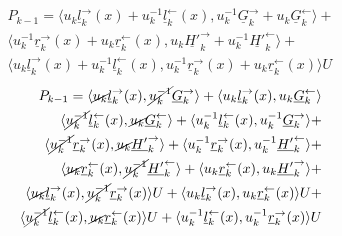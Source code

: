 \begin{align*}
P_{k-1} = \langle u_{k} \underline{l}_{k}^{\rightarrow}(x) + u_{k}^{-1} \underline{l}_{k}^{\leftarrow}(x), u_{k}^{-1} \underline{G}_{k}^{\rightarrow} + u_{k} \underline{G}_{k}^{\leftarrow}\rangle +\\ \langle u_{k}^{-1} \underline{r}_{k}^{\rightarrow}(x) + u_{k} \underline{r}_{k}^{\leftarrow}(x), u_{k} \underline{H'}_{k}^{\rightarrow} + u_{k}^{-1} \underline{H'}_{k}^{\leftarrow}\rangle +\\\langle u_{k} \underline{l}_{k}^{\rightarrow}(x) + u_{k}^{-1} \underline{l}_{k}^{\leftarrow}(x), u_{k}^{-1} \underline{r}_{k}^{\rightarrow}(x) + u_{k} \underline{r}_{k}^{\leftarrow}(x)\rangle U
\end{align*}
\newline
\begin{align*}
P_{k-1} = 
\langle \cancel{u_{k}} \underline{l}_{k}^{\rightarrow}(x), \cancel{u_{k}^{-1}} \underline{G}_{k}^{\rightarrow}\rangle + \langle u_{k} \underline{l}_{k}^{\rightarrow}(x), u_{k} \underline{G}_{k}^{\leftarrow}\rangle \\
\langle \cancel{u_{k}^{-1}} \underline{l}_{k}^{\leftarrow}(x), \cancel{u_{k}} \underline{G}_{k}^{\leftarrow}\rangle + \langle u_{k}^{-1} \underline{l}_{k}^{\leftarrow}(x), u_{k}^{-1} \underline{G}_{k}^{\rightarrow}\rangle +\\ 
\langle \cancel{u_{k}^{-1}} \underline{r}_{k}^{\rightarrow}(x), \cancel{u_{k}} \underline{H'}_{k}^{\rightarrow}\rangle + \langle u_{k}^{-1} \underline{r}_{k}^{\rightarrow}(x), u_{k}^{-1} \underline{H'}_{k}^{\leftarrow}\rangle +\\
\langle \cancel{u_{k}} \underline{r}_{k}^{\leftarrow}(x), \cancel{u_{k}^{-1}} \underline{H'}_{k}^{\leftarrow}\rangle + \langle u_{k} \underline{r}_{k}^{\leftarrow}(x), u_{k} \underline{H'}_{k}^{\rightarrow}\rangle +\\
\langle \cancel{u_{k}} \underline{l}_{k}^{\rightarrow}(x), \cancel{u_{k}^{-1}} \underline{r}_{k}^{\rightarrow}(x) \rangle U + \langle u_{k} \underline{l}_{k}^{\rightarrow}(x), u_{k} \underline{r}_{k}^{\leftarrow}(x)\rangle U +\\
\langle \cancel{u_{k}^{-1}} \underline{l}_{k}^{\leftarrow}(x), \cancel{u_{k}} \underline{r}_{k}^{\leftarrow}(x)\rangle U + \langle u_{k}^{-1} \underline{l}_{k}^{\leftarrow}(x), u_{k}^{-1} \underline{r}_{k}^{\rightarrow}(x)\rangle U
\end{align*}
\newline

